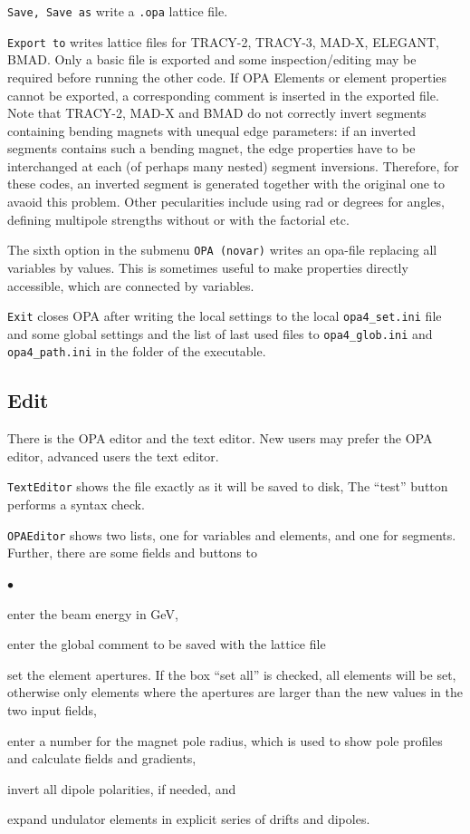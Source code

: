 \documentclass[12pt]{article}
\newenvironment{mylist}
  {\begin{list}{$\bullet$}{\parsep 0pt}}
  {\end{list}}
\begin{document}
{\tt Save, Save as} write a {\tt *.opa} lattice file.

{\tt Export to} writes lattice files for TRACY-2, TRACY-3, MAD-X, ELEGANT, BMAD. Only a basic file is exported and some inspection/editing may be required before running the other code. If OPA Elements or element properties cannot be exported, a corresponding comment is inserted in the exported file. Note that TRACY-2, MAD-X and BMAD do not correctly invert segments containing bending magnets with unequal edge parameters: if an inverted segments contains such a bending magnet, the edge properties have to be interchanged at each (of perhaps many nested) segment inversions. Therefore, for these codes, an inverted segment is generated together with the original one to avaoid this problem. Other pecularities include using rad or degrees for angles, defining multipole strengths without or with the factorial etc. 

The sixth option in the submenu {\tt OPA (novar)} writes an opa-file replacing all variables by values. This is sometimes useful to make properties directly accessible, which are connected by variables.

{\tt Exit} closes OPA after writing the local settings to the local {\tt opa4\_set.ini} file and some global settings and the list of last used files to {\tt opa4\_glob.ini} and {\tt opa4\_path.ini} in the folder of the executable.


\subsection{Edit}

There is the OPA editor and the text editor.
New users may prefer the OPA editor, advanced users the text editor.

{\tt TextEditor} shows the file exactly as it will be saved to disk,
The ``test'' button performs a syntax check. 

{\tt OPAEditor} shows two lists, one for variables and elements, and one for segments. 
Further, there are some fields and buttons to
\begin{mylist}
\item enter the beam energy in GeV,
\item enter the global comment to be saved with the lattice file
\item set the element apertures. If the box ``set all'' is checked, all elements will be set, otherwise only elements where the apertures are larger than the new values in the two input fields,
\item enter a number for the magnet pole radius, which is used to show pole profiles and calculate fields and gradients,
\item invert all dipole polarities, if needed, and
\item expand undulator elements in explicit series of drifts and dipoles.
\end{mylist}
\end{document}
